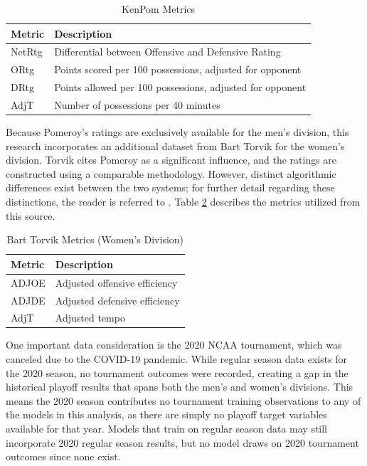 \documentclass[12pt,leqno]{article}\usepackage[pdftex]{graphicx}\usepackage[dvipsnames]{xcolor}
\theoremstyle{remark}
\begin{document}
\begin{table}[h]
\centering
\begin{tabular}{ll}
\hline
\textbf{Metric} & \textbf{Description} \\
\hline
NetRtg & Differential between Offensive and Defensive Rating \\
ORtg   & Points scored per 100 possessions, adjusted for opponent \\
DRtg   & Points allowed per 100 possessions, adjusted for opponent \\
AdjT   & Number of possessions per 40 minutes \\
\hline
\end{tabular}
\caption{KenPom Metrics}
\label{tab:kenpom}
\end{table}
Because Pomeroy's ratings are exclusively available for the men's division, this research incorporates an additional dataset from Bart Torvik for the women's division. Torvik cites Pomeroy as a significant influence, and the ratings are constructed using a comparable methodology. However, distinct algorithmic differences exist between the two systems; for further detail regarding these distinctions, the reader is referred to \cite{Torvik}. Table \ref{tab:torvik} describes the metrics utilized from this source.

\begin{table}[h]
\centering
\begin{tabular}{ll}
\hline
\textbf{Metric} & \textbf{Description} \\
\hline
ADJOE & Adjusted offensive efficiency \\
ADJDE & Adjusted defensive efficiency \\
AdjT  & Adjusted tempo \\
\hline
\end{tabular}
\caption{Bart Torvik Metrics (Women's Division)}
\label{tab:torvik}
\end{table}

One important data consideration is the 2020 NCAA tournament, which was canceled due to the COVID-19 pandemic. While regular season data exists for the 2020 season, no tournament outcomes were recorded, creating a gap in the historical playoff results that spans both the men's and women's divisions. This means the 2020 season contributes no tournament training observations to any of the models in this analysis, as there are simply no playoff target variables available for that year. Models that train on regular season data may still incorporate 2020 regular season results, but no model draws on 2020 tournament outcomes since none exist.
\end{document}
